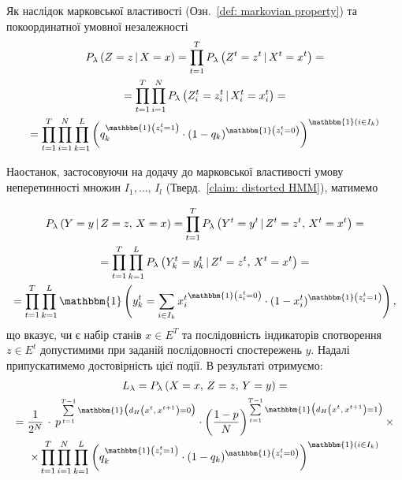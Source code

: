 Як наслідок марковської властивості (Озн.~\ref{def: markovian property}) та покоординатної умовної незалежності
\begin{multline*}
    P_\lambda \left( Z=z \,|\, X=x \right) = \prod_{t=1}^T P_\lambda \left( Z^t=z^t \,|\, X^t=x^t \right) = \\ 
    = \prod_{t=1}^T \prod_{i=1}^N P_\lambda \left( Z^t_i=z^t_i \,|\, X^t_i=x^t_i \right) = \\ 
    = \prod_{t=1}^T \prod_{i=1}^N \prod_{k=1}^L \left( q_k^{\mathbbm{1} \left( z^t_i =1 \right)} \cdot (1-q_k)^{\mathbbm{1} \left( z^t_i =0 \right)} \right)^{\mathbbm{1} \left( i \in I_k \right)}
\end{multline*}

Наостанок, застосовуючи на додачу до марковської властивості умову неперетинності множин $I_1,\ldots,\,I_l$ (Тверд.~\ref{claim: distorted HMM}), матимемо

\begin{multline*}
    P_\lambda \left( Y=y \,|\, Z=z,\,X=x \right) = \prod_{t=1}^T P_\lambda \left( Y^t=y^t \,|\, Z^t=z^t,\,X^t=x^t \right) = \\ 
    = \prod_{t=1}^T \prod_{k=1}^L P_\lambda \left( Y^t_k=y^t_k \,|\, Z^t=z^t,\,X^t=x^t \right) = \\ 
    = \prod_{t=1}^T \prod_{k=1}^L \mathbbm{1} \left( y^t_k = \sum\limits_{i \in I_k} {x^t_i}^{\mathbbm{1} \left( z^t_i=0 \right)} \cdot (1-x^t_i)^{\mathbbm{1} \left( z^t_i=1 \right)} \right),
\end{multline*}
що вказує, чи є набір станів $x \in E^T$ та послідовність індикаторів спотворення $z \in E^t$ допустимими при заданій послідовності спостережень $y$. Надалі припускатимемо достовірність цієї події. В результаті отримуємо:
\begin{multline*}
    L_{\lambda} = P_\lambda \left( X=x,\,Z=z,\,Y=y \right) = \\ 
    = \frac{1}{2^N}\, \cdot\, p^{\sum\limits_{t=1}^{T-1} \mathbbm{1} \bigl( d_H\left( x^t,\,x^{t+1} \right) = 0 \bigr)} \cdot \left(\frac{1-p}{N}\right)^{\sum\limits_{t=1}^{T-1} \mathbbm{1} \bigl( d_H\left( x^t,\,x^{t+1} \right) = 1 \bigr)} \times \\
    \times \prod_{t=1}^T \prod_{i=1}^N \prod_{k=1}^L \left( q_k^{\mathbbm{1} \left( z^t_i =1 \right)} \cdot (1-q_k)^{\mathbbm{1} \left( z^t_i =0 \right)} \right)^{\mathbbm{1} \left( i \in I_k \right)}
\end{multline*}

